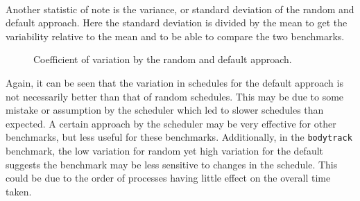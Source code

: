 \documentclass{article}
\newcommand{\n}[0]{\\[\baselineskip]}
\begin{document}
\n
Another statistic of note is the variance, or standard deviation of the random and default approach. Here the standard deviation is divided by the mean to get the variability relative to the mean and to be able to compare the two benchmarks.
\begin{figure}[H]
\centering
{}
\caption{Coefficient of variation by the random and default approach.}
\label{fig:variance}
\end{figure}
\noindent Again, it can be seen that the variation in schedules for the default approach is not necessarily better than that of random schedules. This may be due to some mistake or assumption by the scheduler which led to slower schedules than expected. A certain approach by the scheduler may be very effective for other benchmarks, but less useful for these benchmarks. Additionally, in the \texttt{bodytrack} benchmark, the low variation for random yet high variation for the default suggests the benchmark may be less sensitive to changes in the schedule. This could be due to the order of processes having little effect on the overall time taken.
\end{document}
